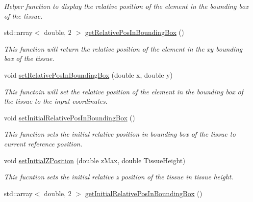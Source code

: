 \begin{DoxyCompactItemize}
\begin{DoxyCompactList}\small\item\em Helper function to display the relative position of the element in the bounding box of the tissue. \end{DoxyCompactList}\item 
\hypertarget{classShapeBase_ad50e45399c54ae205ae1adabbc485ff1}{}std\+::array$<$ double, 2 $>$ \hyperlink{classShapeBase_ad50e45399c54ae205ae1adabbc485ff1}{get\+Relative\+Pos\+In\+Bounding\+Box} ()\label{classShapeBase_ad50e45399c54ae205ae1adabbc485ff1}

\begin{DoxyCompactList}\small\item\em This function will return the relative position of the element in the xy bounding box of the tissue. \end{DoxyCompactList}\item 
\hypertarget{classShapeBase_a71d8a64fec5591d51c6d54ea76711e0d}{}void \hyperlink{classShapeBase_a71d8a64fec5591d51c6d54ea76711e0d}{set\+Relative\+Pos\+In\+Bounding\+Box} (double x, double y)\label{classShapeBase_a71d8a64fec5591d51c6d54ea76711e0d}

\begin{DoxyCompactList}\small\item\em This functoin will set the relative position of the element in the bounding box of the tissue to the input coordinates. \end{DoxyCompactList}\item 
\hypertarget{classShapeBase_a8c7a7578407be503531bf14af6d004d1}{}void \hyperlink{classShapeBase_a8c7a7578407be503531bf14af6d004d1}{set\+Initial\+Relative\+Pos\+In\+Bounding\+Box} ()\label{classShapeBase_a8c7a7578407be503531bf14af6d004d1}

\begin{DoxyCompactList}\small\item\em This function sets the initial relative position in bounding box of the tissue to current reference position. \end{DoxyCompactList}\item 
\hypertarget{classShapeBase_a3e054f84b56303812eee5b3abeec9b2f}{}void \hyperlink{classShapeBase_a3e054f84b56303812eee5b3abeec9b2f}{set\+Initial\+Z\+Position} (double z\+Max, double Tissue\+Height)\label{classShapeBase_a3e054f84b56303812eee5b3abeec9b2f}

\begin{DoxyCompactList}\small\item\em This fucntion sets the initial relative z position of the tissue in tissue height. \end{DoxyCompactList}\item 
\hypertarget{classShapeBase_a775b57d5074679c6fd4d3f57885e86d8}{}std\+::array$<$ double, 2 $>$ \hyperlink{classShapeBase_a775b57d5074679c6fd4d3f57885e86d8}{get\+Initial\+Relative\+Pos\+In\+Bounding\+Box} ()\label{classShapeBase_a775b57d5074679c6fd4d3f57885e86d8}


\end{DoxyCompactItemize}
